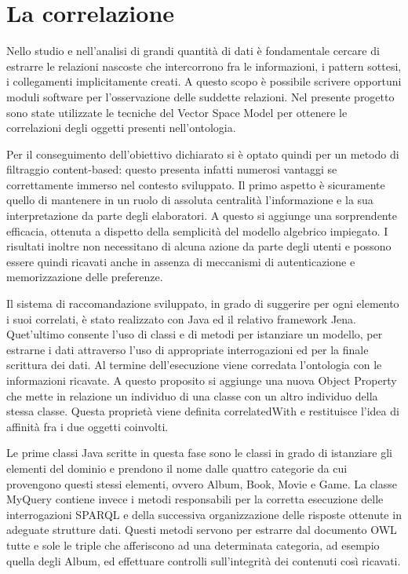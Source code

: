 \documentclass[Lau,binding=0.6cm,noexaminfo,oneside]{sapthesis}
\begin{document}
\section{La correlazione}

Nello studio e nell'analisi di grandi quantità di dati è fondamentale cercare di estrarre le relazioni nascoste che intercorrono fra le informazioni, i pattern sottesi, i collegamenti implicitamente creati. A questo scopo è possibile scrivere opportuni moduli software per l'osservazione delle suddette relazioni. Nel presente progetto sono state utilizzate le tecniche del Vector Space Model per ottenere le correlazioni degli oggetti presenti nell'ontologia.\medskip

Per il conseguimento dell'obiettivo dichiarato si è optato quindi per un metodo di filtraggio content-based: questo presenta infatti numerosi vantaggi se correttamente immerso nel contesto sviluppato. Il primo aspetto è sicuramente quello di mantenere in un ruolo di assoluta centralità l'informazione e la sua interpretazione da parte degli elaboratori. A questo si aggiunge una sorprendente efficacia, ottenuta a dispetto della semplicità del modello algebrico impiegato. I risultati inoltre non necessitano di alcuna azione da parte degli utenti e possono essere quindi ricavati anche in assenza di meccanismi di autenticazione e memorizzazione delle preferenze.\medskip

Il sistema di raccomandazione sviluppato, in grado di suggerire per ogni elemento i suoi correlati, è stato realizzato con Java ed il relativo framework Jena. Quet'ultimo consente l'uso di classi e di metodi per istanziare un modello, per estrarne i dati attraverso l'uso di appropriate interrogazioni ed per la finale scrittura dei dati. Al termine dell'esecuzione viene corredata l'ontologia con le informazioni ricavate. A questo proposito si aggiunge una nuova Object Property che mette in relazione un individuo di una classe con un altro individuo della stessa classe. Questa proprietà viene definita correlatedWith e restituisce l'idea di affinità fra i due oggetti coinvolti.\medskip

Le prime classi Java scritte in questa fase sono le classi in grado di istanziare gli elementi del dominio e prendono il nome dalle quattro categorie da cui provengono questi stessi elementi, ovvero Album, Book, Movie e Game. La classe MyQuery contiene invece i metodi responsabili per la corretta esecuzione delle interrogazioni SPARQL e della successiva organizzazione delle risposte ottenute in adeguate strutture dati. Questi metodi servono per estrarre dal documento OWL tutte e sole le triple che afferiscono ad una determinata categoria, ad esempio quella degli Album, ed effettuare controlli sull'integrità dei contenuti così ricavati.\medskip
\end{document}
